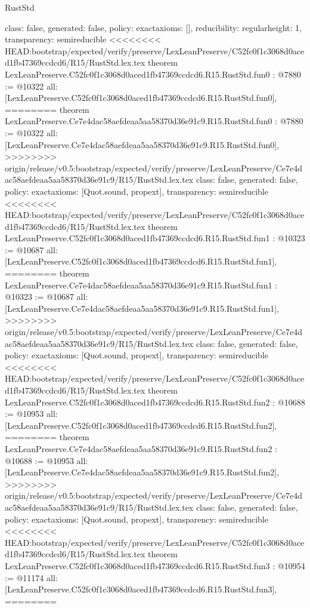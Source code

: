 \begin{lexlean}{RustStd}
\begin{coremodule}
{\begin{coremodule}
{{{  class: false,
  generated: false,
  policy: exact{axioms: []},
  reducibility: regular{height: 1},
  transparency: semireducible
}
<<<<<<<< HEAD:bootstrap/expected/verify/preserve/LexLeanPreserve/C52fc0f1c3068d0aced1fb47369ccdcd6/R15/RustStd.lex.tex
theorem LexLeanPreserve.C52fc0f1c3068d0aced1fb47369ccdcd6.R15.RustStd.fun0 : @7880 := @10322 {
  all: [LexLeanPreserve.C52fc0f1c3068d0aced1fb47369ccdcd6.R15.RustStd.fun0],
========
theorem LexLeanPreserve.Ce7e4dac58aefdeaa5aa58370d36e91c9.R15.RustStd.fun0 : @7880 := @10322 {
  all: [LexLeanPreserve.Ce7e4dac58aefdeaa5aa58370d36e91c9.R15.RustStd.fun0],
>>>>>>>> origin/release/v0.5:bootstrap/expected/verify/preserve/LexLeanPreserve/Ce7e4dac58aefdeaa5aa58370d36e91c9/R15/RustStd.lex.tex
  class: false,
  generated: false,
  policy: exact{axioms: [Quot.sound, propext]},
  transparency: semireducible
}
<<<<<<<< HEAD:bootstrap/expected/verify/preserve/LexLeanPreserve/C52fc0f1c3068d0aced1fb47369ccdcd6/R15/RustStd.lex.tex
theorem LexLeanPreserve.C52fc0f1c3068d0aced1fb47369ccdcd6.R15.RustStd.fun1 : @10323 := @10687 {
  all: [LexLeanPreserve.C52fc0f1c3068d0aced1fb47369ccdcd6.R15.RustStd.fun1],
========
theorem LexLeanPreserve.Ce7e4dac58aefdeaa5aa58370d36e91c9.R15.RustStd.fun1 : @10323 := @10687 {
  all: [LexLeanPreserve.Ce7e4dac58aefdeaa5aa58370d36e91c9.R15.RustStd.fun1],
>>>>>>>> origin/release/v0.5:bootstrap/expected/verify/preserve/LexLeanPreserve/Ce7e4dac58aefdeaa5aa58370d36e91c9/R15/RustStd.lex.tex
  class: false,
  generated: false,
  policy: exact{axioms: [Quot.sound, propext]},
  transparency: semireducible
}
<<<<<<<< HEAD:bootstrap/expected/verify/preserve/LexLeanPreserve/C52fc0f1c3068d0aced1fb47369ccdcd6/R15/RustStd.lex.tex
theorem LexLeanPreserve.C52fc0f1c3068d0aced1fb47369ccdcd6.R15.RustStd.fun2 : @10688 := @10953 {
  all: [LexLeanPreserve.C52fc0f1c3068d0aced1fb47369ccdcd6.R15.RustStd.fun2],
========
theorem LexLeanPreserve.Ce7e4dac58aefdeaa5aa58370d36e91c9.R15.RustStd.fun2 : @10688 := @10953 {
  all: [LexLeanPreserve.Ce7e4dac58aefdeaa5aa58370d36e91c9.R15.RustStd.fun2],
>>>>>>>> origin/release/v0.5:bootstrap/expected/verify/preserve/LexLeanPreserve/Ce7e4dac58aefdeaa5aa58370d36e91c9/R15/RustStd.lex.tex
  class: false,
  generated: false,
  policy: exact{axioms: [Quot.sound, propext]},
  transparency: semireducible
}
<<<<<<<< HEAD:bootstrap/expected/verify/preserve/LexLeanPreserve/C52fc0f1c3068d0aced1fb47369ccdcd6/R15/RustStd.lex.tex
theorem LexLeanPreserve.C52fc0f1c3068d0aced1fb47369ccdcd6.R15.RustStd.fun3 : @10954 := @11174 {
  all: [LexLeanPreserve.C52fc0f1c3068d0aced1fb47369ccdcd6.R15.RustStd.fun3],
========
}}}}}}
\end{coremodule}}
\end{coremodule}
\end{lexlean}

